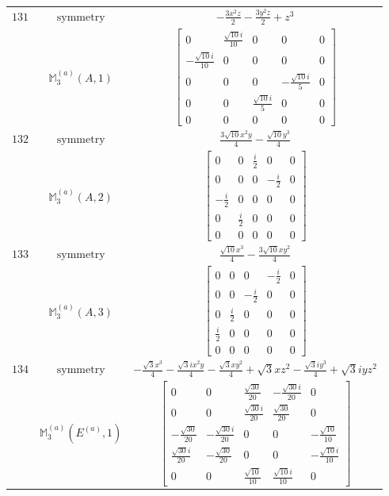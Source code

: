 \documentclass[fleqn,8pt,landscape]{jsarticle}
\begin{document}
\begin{longtable}{ccc}
$ 131 $ & $ \text{symmetry} $ & $ - \frac{3 x^{2} z}{2} - \frac{3 y^{2} z}{2} + z^{3} $ \\
$  $ & $ \mathbb{M}_{3}^{(a)}(A,1) $ & $ \begin{bmatrix} 0 & \frac{\sqrt{10} i}{10} & 0 & 0 & 0 \\ - \frac{\sqrt{10} i}{10} & 0 & 0 & 0 & 0 \\ 0 & 0 & 0 & - \frac{\sqrt{10} i}{5} & 0 \\ 0 & 0 & \frac{\sqrt{10} i}{5} & 0 & 0 \\ 0 & 0 & 0 & 0 & 0 \end{bmatrix} $ \\ \hline
$ 132 $ & $ \text{symmetry} $ & $ \frac{3 \sqrt{10} x^{2} y}{4} - \frac{\sqrt{10} y^{3}}{4} $ \\
$  $ & $ \mathbb{M}_{3}^{(a)}(A,2) $ & $ \begin{bmatrix} 0 & 0 & \frac{i}{2} & 0 & 0 \\ 0 & 0 & 0 & - \frac{i}{2} & 0 \\ - \frac{i}{2} & 0 & 0 & 0 & 0 \\ 0 & \frac{i}{2} & 0 & 0 & 0 \\ 0 & 0 & 0 & 0 & 0 \end{bmatrix} $ \\ \hline
$ 133 $ & $ \text{symmetry} $ & $ \frac{\sqrt{10} x^{3}}{4} - \frac{3 \sqrt{10} x y^{2}}{4} $ \\
$  $ & $ \mathbb{M}_{3}^{(a)}(A,3) $ & $ \begin{bmatrix} 0 & 0 & 0 & - \frac{i}{2} & 0 \\ 0 & 0 & - \frac{i}{2} & 0 & 0 \\ 0 & \frac{i}{2} & 0 & 0 & 0 \\ \frac{i}{2} & 0 & 0 & 0 & 0 \\ 0 & 0 & 0 & 0 & 0 \end{bmatrix} $ \\ \hline
$ 134 $ & $ \text{symmetry} $ & $ - \frac{\sqrt{3} x^{3}}{4} - \frac{\sqrt{3} i x^{2} y}{4} - \frac{\sqrt{3} x y^{2}}{4} + \sqrt{3} x z^{2} - \frac{\sqrt{3} i y^{3}}{4} + \sqrt{3} i y z^{2} $ \\
$  $ & $ \mathbb{M}_{3}^{(a)}(E^{(a)},1) $ & $ \begin{bmatrix} 0 & 0 & \frac{\sqrt{30}}{20} & - \frac{\sqrt{30} i}{20} & 0 \\ 0 & 0 & \frac{\sqrt{30} i}{20} & \frac{\sqrt{30}}{20} & 0 \\ - \frac{\sqrt{30}}{20} & - \frac{\sqrt{30} i}{20} & 0 & 0 & - \frac{\sqrt{10}}{10} \\ \frac{\sqrt{30} i}{20} & - \frac{\sqrt{30}}{20} & 0 & 0 & - \frac{\sqrt{10} i}{10} \\ 0 & 0 & \frac{\sqrt{10}}{10} & \frac{\sqrt{10} i}{10} & 0 \end{bmatrix} $ \\ \hline

\end{longtable}
\end{document}
